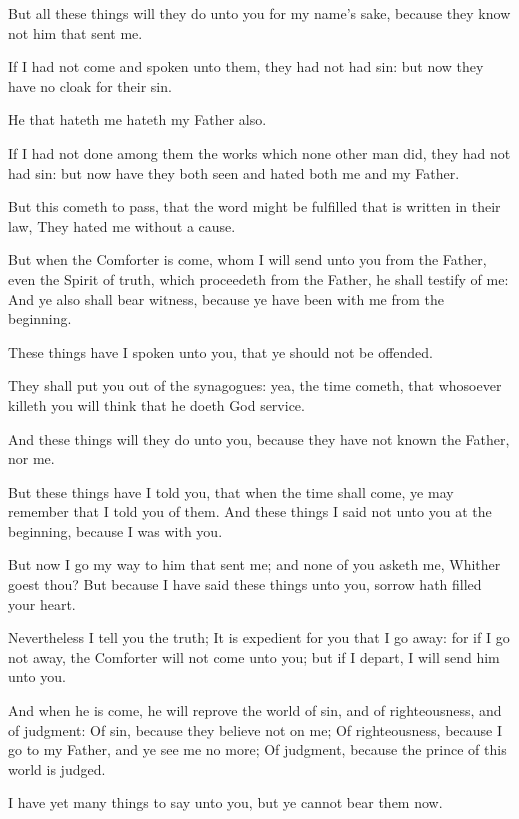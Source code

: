 \Verse But all these things will they do unto you for my name's sake, because they know not him that sent me.

\Verse If I had not come and spoken unto them, they had not had sin: but now they have no cloak for their sin.

\Verse He that hateth me hateth my Father also.

\Verse If I had not done among them the works which none other man did, they had not had sin: but now have they both seen and hated both me and my Father.

\Verse But this cometh to pass, that the word might be fulfilled that is written in their law, They hated me without a cause.

\Verse But when the Comforter is come, whom I will send unto you from the Father, even the Spirit of truth, which proceedeth from the Father, he shall testify of me: \Verse And ye also shall bear witness, because ye have been with me from the beginning.


\Chapter
\Verse These things have I spoken unto you, that ye should not be offended.

\Verse They shall put you out of the synagogues: yea, the time cometh, that whosoever killeth you will think that he doeth God service.

\Verse And these things will they do unto you, because they have not known the Father, nor me.

\Verse But these things have I told you, that when the time shall come, ye may remember that I told you of them. And these things I said not unto you at the beginning, because I was with you.

\Verse But now I go my way to him that sent me; and none of you asketh me, Whither goest thou?  \Verse But because I have said these things unto you, sorrow hath filled your heart.

\Verse Nevertheless I tell you the truth; It is expedient for you that I go away: for if I go not away, the Comforter will not come unto you; but if I depart, I will send him unto you.

\Verse And when he is come, he will reprove the world of sin, and of righteousness, and of judgment: \Verse Of sin, because they believe not on me; \Verse Of righteousness, because I go to my Father, and ye see me no more; \Verse Of judgment, because the prince of this world is judged.

\Verse I have yet many things to say unto you, but ye cannot bear them now.

